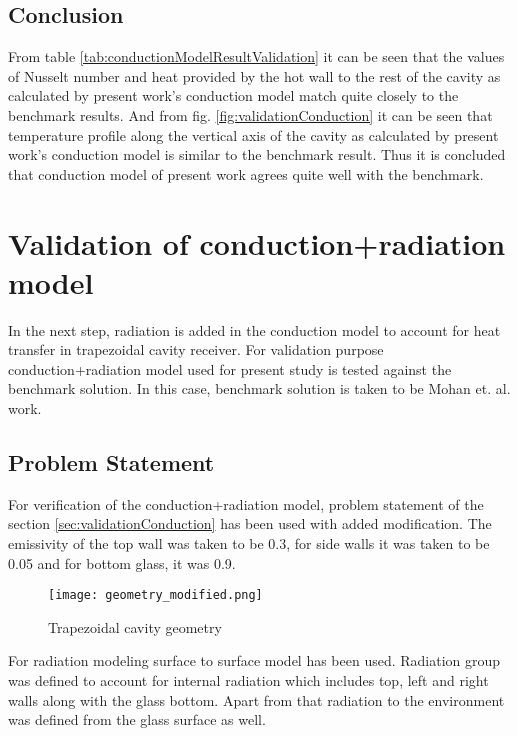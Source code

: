\subsection{Conclusion}

From table \ref{tab:conductionModelResultValidation} it can be seen that the values of Nusselt number and heat provided by the hot wall to the rest of the cavity as calculated by present work's conduction model match quite closely to the benchmark results. And from fig. \ref{fig:validationConduction} it can be seen that temperature profile along the vertical axis of the cavity as calculated by present work's conduction model is similar to the benchmark result. Thus it is concluded that conduction model of present work agrees quite well with the benchmark.


\section{Validation of conduction+radiation model}\label{sec:validationcon+radModel}
In the next step, radiation is added in the conduction model to account for heat transfer in trapezoidal cavity receiver. For validation purpose conduction+radiation model used for present study is tested against the benchmark solution. In this case, benchmark solution is taken to be Mohan et. al.\citep{MOHAN201837} work.
\subsection{Problem Statement}
For verification of the conduction+radiation model, problem statement of the section \ref{sec:validationConduction} has been used with added modification. The emissivity of the top wall was taken to be 0.3, for side walls it was taken to be 0.05 and for bottom glass, it was 0.9. 
\begin{figure}[H]
\begin{center}
\texttt{[image: geometry\_modified.png]}
\caption{Trapezoidal cavity geometry}
\label{geometry_modified}
\end{center}
\end{figure}

For radiation modeling surface to surface model has been used. Radiation group was defined to account for internal radiation which includes top, left and right walls along with the glass bottom. Apart from that radiation to the environment was defined from the glass surface as well.
